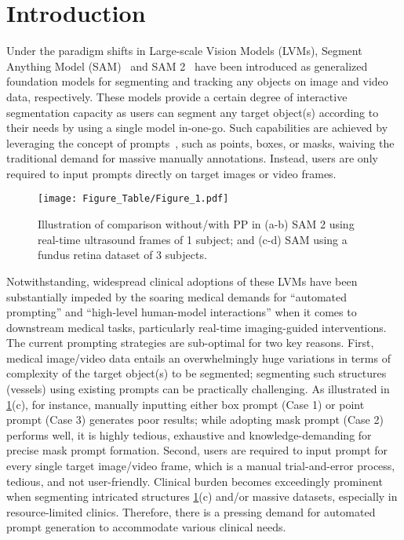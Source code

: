 \section{Introduction}
\label{sec:intro}

Under the paradigm shifts in Large-scale Vision Models (LVMs), Segment Anything Model (SAM)~\cite{kirillov2023segment} and SAM 2~\cite{ravi2024sam} have been introduced as generalized foundation models for segmenting and tracking any objects on image and video data, respectively. These models provide a certain degree of interactive segmentation capacity as users can segment any target object(s) according to their needs by using a single model in-one-go. Such capabilities are achieved by leveraging the concept of prompts~\cite{wang2023review}, such as points, boxes, or masks, waiving the traditional demand for massive manually annotations. Instead, users are only required to input prompts directly on target images or video frames.

\begin{figure}[t]
  \centering
  \setlength{\abovecaptionskip}{3pt}
   \texttt{[image: Figure\_Table/Figure\_1.pdf]}
   \caption{Illustration of comparison without/with PP in (a-b) SAM 2 using real-time ultrasound frames of 1 subject; and (c-d) SAM using a fundus retina dataset of 3 subjects.}
   \label{fig:Figure1}
   \vspace{-15pt}
\end{figure}

Notwithstanding, widespread clinical adoptions of these LVMs have been substantially impeded by the soaring medical demands for ``automated prompting'' and ``high-level human-model interactions'' when it comes to downstream medical tasks, particularly real-time imaging-guided interventions. The current prompting strategies are sub-optimal for two key reasons. First, medical image/video data entails an overwhelmingly huge variations in terms of complexity of the target object(s) to be segmented; segmenting such structures (\eg vessels) using existing prompts can be practically challenging. As illustrated in \cref{fig:Figure1}(c), for instance, manually inputting either box prompt (Case 1) or point prompt (Case 3) generates poor results; while adopting mask prompt (Case 2) performs well, it is highly tedious, exhaustive and knowledge-demanding for precise mask prompt formation. Second, users are required to input prompt for every single target image/video frame, which is a manual trial-and-error process, tedious, and not user-friendly. Clinical burden becomes exceedingly prominent when segmenting intricated structures \cref{fig:Figure1}(c) and/or massive datasets, especially in resource-limited clinics. Therefore, there is a pressing demand for automated prompt generation to accommodate various clinical needs.

